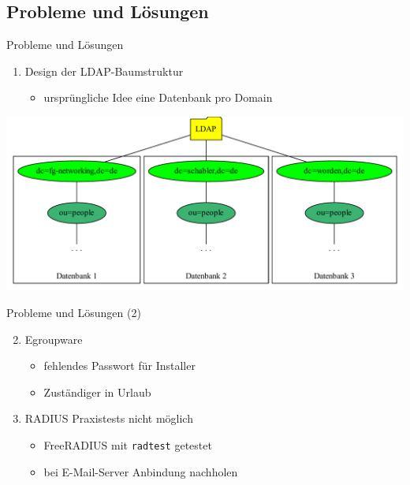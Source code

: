 \documentclass[presentation,svgnames,12pt]{beamer}
\begin{document}
\subsection{Probleme und Lösungen}
\begin{frame}{Probleme und Lösungen}
\begin{enumerate}
	\item Design der LDAP-Baumstruktur
	\vspace{6pt}
	\begin{itemize}
		\item ursprüngliche Idee eine Datenbank pro Domain
	\end{itemize}
\end{enumerate}
\vspace{2pt}
\centering
\includegraphics[width=\textwidth]{Bilder/LDAP-fgn-planned.pdf}
\end{frame}

\begin{frame}{Probleme und Lösungen (2)}
\begin{enumerate}
	\setcounter{enumi}{1}
	\item Egroupware
	\vspace{6pt}
	\begin{itemize}
		\item fehlendes Passwort für Installer
		\item Zuständiger in Urlaub
	\end{itemize}
	\medskip
	\item RADIUS Praxistests nicht möglich
	\vspace{6pt}
	\begin{itemize}
		\item FreeRADIUS mit \texttt{radtest} getestet
		\item bei E-Mail-Server Anbindung nachholen
	\end{itemize}
\end{enumerate}
\end{frame}
\end{document}
